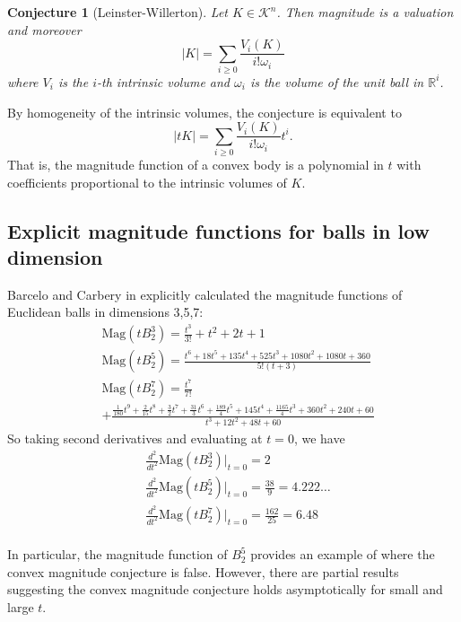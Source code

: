 \documentclass[11pt]{article}
\theoremstyle{mythm}
\newtheorem*{conj}{Conjecture}
\begin{document}
\begin{conj}[Leinster-Willerton]
Let $K\in\mathcal{K}^n$. Then magnitude is a valuation and moreover
\begin{equation*}
\vert K \vert = \sum\limits_{i\geq0}\frac{V_i(K)}{i!\omega_i}
\end{equation*}
where $V_i$ is the $i$-th intrinsic volume and $\omega_i$ is the volume of the unit ball in $\mathbb{R}^i$.
\end{conj}

By homogeneity of the intrinsic volumes, the conjecture is equivalent to
\begin{equation*}
\vert tK \vert = \sum\limits_{i\geq0}\frac{V_i(K)}{i!\omega_i}t^i.
\end{equation*}
That is, the magnitude function of a convex body is a polynomial in $t$ with coefficients proportional to the intrinsic volumes of $K$.

\subsection{Explicit magnitude functions for balls in low dimension}

Barcelo and Carbery in \cite{barcelo_magnitudes_2016} explicitly calculated the magnitude functions of Euclidean balls in dimensions 3,5,7:
\begin{align*}
&\text{Mag}(tB_2^3) = \frac{t^3}{3!}+t^2+2t+1 \\
&\text{Mag}(tB_2^5) = \frac{t^6+18t^5+135t^4+525t^3+1080t^2+1080t+360}{5!(t+3)} \\
&\text{Mag}(tB_2^7) = \frac{t^7}{7!} \\
&+ \frac{\frac{1}{180}t^9+\frac{2}{15}t^8+\frac{3}{2}t^7+\frac{31}{3}t^6+\frac{189}{4}t^5+145t^4+\frac{1165}{4}t^3+360t^2+240t+60}{t^3+12t^2+48t+60}
\end{align*}
So taking second derivatives and evaluating at $t = 0$, we have
\begin{align*}
&\frac{d^2}{dt^2}\text{Mag}(tB_2^3)\big\vert_{t=0} = 2 \\
&\frac{d^2}{dt^2}\text{Mag}(tB_2^5)\big\vert_{t=0} = \frac{38}{9} = 4.222\dots \\
&\frac{d^2}{dt^2}\text{Mag}(tB_2^7)\big\vert_{t=0} = \frac{162}{25} = 6.48 \\
\end{align*}

In particular, the magnitude function of $B_2^5$ provides an example of where the convex magnitude conjecture is false. However, there are partial results suggesting the convex magnitude conjecture holds asymptotically for small and large $t$.
\end{document}
